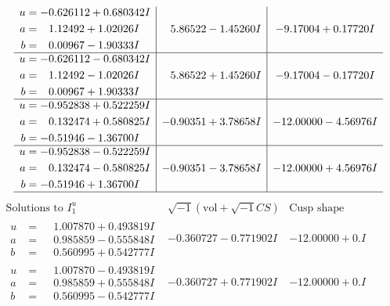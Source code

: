 \documentclass[1p]{elsarticle_modified}
\theoremstyle{definition}
\newcommand{\I}{\sqrt{-1}}
\begin{document}
$$\begin{array}{c|c|c}
\begin{aligned}
u &= -0.626112 + 0.680342 I \\
a &= \phantom{-}1.12492 + 1.02026 I \\
b &= \phantom{-}0.00967 - 1.90333 I\end{aligned}
 & \phantom{-}5.86522 - 1.45260 I & -9.17004 + 0.17720 I \\ \hline\begin{aligned}
u &= -0.626112 - 0.680342 I \\
a &= \phantom{-}1.12492 - 1.02026 I \\
b &= \phantom{-}0.00967 + 1.90333 I\end{aligned}
 & \phantom{-}5.86522 + 1.45260 I & -9.17004 - 0.17720 I \\ \hline\begin{aligned}
u &= -0.952838 + 0.522259 I \\
a &= \phantom{-}0.132474 + 0.580825 I \\
b &= -0.51946 - 1.36700 I\end{aligned}
 & -0.90351 + 3.78658 I & -12.00000 - 4.56976 I \\ \hline\begin{aligned}
u &= -0.952838 - 0.522259 I \\
a &= \phantom{-}0.132474 - 0.580825 I \\
b &= -0.51946 + 1.36700 I\end{aligned}
 & -0.90351 - 3.78658 I & -12.00000 + 4.56976 I\\
 \hline 
 \end{array}$$\newpage$$\begin{array}{c|c|c}  
\text{Solutions to }I^u_{1}& \I (\text{vol} + \sqrt{-1}CS) & \text{Cusp shape}\\
 \hline 
\begin{aligned}
u &= \phantom{-}1.007870 + 0.493819 I \\
a &= \phantom{-}0.985859 - 0.555848 I \\
b &= \phantom{-}0.560995 + 0.542777 I\end{aligned}
 & -0.360727 - 0.771902 I & -12.00000 + 0. I\phantom{ +0.000000I} \\ \hline\begin{aligned}
u &= \phantom{-}1.007870 - 0.493819 I \\
a &= \phantom{-}0.985859 + 0.555848 I \\
b &= \phantom{-}0.560995 - 0.542777 I\end{aligned}
 & -0.360727 + 0.771902 I & -12.00000 + 0. I\phantom{ +0.000000I} \\ \hline\begin{aligned}

\end{aligned}
\end{array}$$
\end{document}
